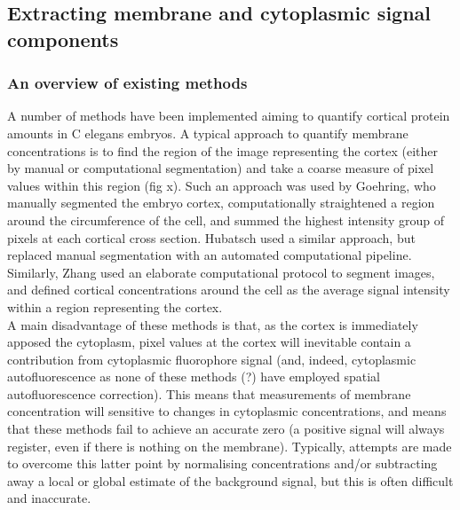 \documentclass[12pt]{"article"}
\begin{document}
\clearpage
\subsection{Extracting membrane and cytoplasmic signal components}


\subsubsection{An overview of existing methods}

A number of methods have been implemented aiming to quantify cortical protein amounts in C elegans embryos. A typical approach to quantify membrane concentrations is to find the region of the image representing the cortex (either by manual or computational segmentation) and take a coarse measure of pixel values within this region (fig x). Such an approach was used by Goehring, who manually segmented the embryo cortex, computationally straightened a region around the circumference of the cell, and summed the highest intensity group of pixels at each cortical cross section. Hubatsch used a similar approach, but replaced manual segmentation with an automated computational pipeline. Similarly, Zhang used an elaborate computational protocol to segment images, and defined cortical concentrations around the cell as the average signal intensity within a region representing the cortex.\\


A main disadvantage of these methods is that, as the cortex is immediately apposed the cytoplasm, pixel values at the cortex will inevitable contain a contribution from cytoplasmic fluorophore signal (and, indeed, cytoplasmic autofluorescence as none of these methods (?) have employed spatial autofluorescence correction). This means that measurements of membrane concentration will sensitive to changes in cytoplasmic concentrations, and means that these methods fail to achieve an accurate zero (a positive signal will always register, even if there is nothing on the membrane). Typically, attempts are made to overcome this latter point by normalising concentrations and/or subtracting away a local or global estimate of the background signal, but this is often difficult and inaccurate.\\
\end{document}
